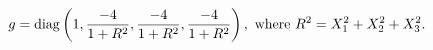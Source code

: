\begin{equation}
g = {\rm diag} \left(1, \frac{-4}{1+R^2},\frac{-4}{1+R^2},\frac{-4}{1+R^2}
\right),\ 
{\rm where}\
R^2 = X_1^2+X_2^2+X_3^2.
\end{equation}

